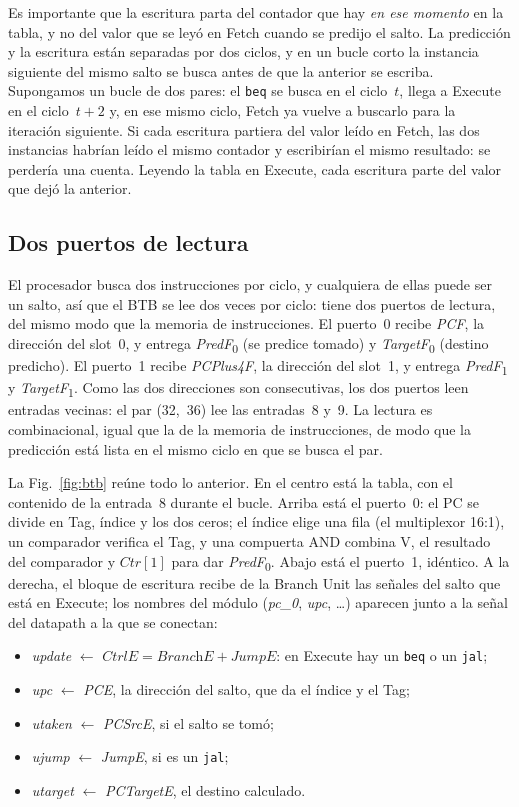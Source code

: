 \documentclass[11pt,a4paper]{article}
\newcommand{\sig}[1]{\textit{#1}}
\newcommand{\sigk}[2]{\textit{#1}\textsubscript{#2}}
\newcommand{\ins}[1]{\texttt{#1}}
\begin{document}
Es importante que la escritura parta del contador que hay \emph{en ese momento} en la tabla,
y no del valor que se leyó en Fetch cuando se predijo el salto. La predicción y la escritura
están separadas por dos ciclos, y en un bucle corto la instancia siguiente del mismo salto se
busca antes de que la anterior se escriba. Supongamos un bucle de dos pares: el \ins{beq} se
busca en el ciclo~$t$, llega a Execute en el ciclo~$t+2$ y, en ese mismo ciclo, Fetch ya
vuelve a buscarlo para la iteración siguiente. Si cada escritura partiera del valor leído en
Fetch, las dos instancias habrían leído el mismo contador y escribirían el mismo resultado:
se perdería una cuenta. Leyendo la tabla en Execute, cada escritura parte del valor que dejó
la anterior.

\subsection{Dos puertos de lectura}

El procesador busca dos instrucciones por ciclo, y cualquiera de ellas puede ser un salto,
así que el BTB se lee dos veces por ciclo: tiene dos puertos de lectura, del mismo modo que
la memoria de instrucciones. El puerto~0 recibe \sig{PCF}, la dirección del slot~0, y
entrega \sigk{PredF}{0} (se predice tomado) y \sigk{TargetF}{0} (destino predicho). El
puerto~1 recibe \sig{PCPlus4F}, la dirección del slot~1, y entrega \sigk{PredF}{1} y
\sigk{TargetF}{1}. Como las dos direcciones son consecutivas, los dos puertos leen
entradas vecinas: el par (32,~36) lee las entradas~8 y~9. La lectura es combinacional,
igual que la de la memoria de instrucciones, de modo que la predicción está lista en el
mismo ciclo en que se busca el par.

La Fig.~\ref{fig:btb} reúne todo lo anterior. En el centro está la tabla, con el contenido
de la entrada~8 durante el bucle. Arriba está el puerto~0: el PC se divide en Tag, índice y
los dos ceros; el índice elige una fila (el multiplexor 16:1), un comparador verifica el
Tag, y una compuerta AND combina V, el resultado del comparador y $\sig{Ctr}[1]$ para dar
\sigk{PredF}{0}. Abajo está el puerto~1, idéntico. A la derecha, el bloque de escritura
recibe de la Branch Unit las señales del salto que está en Execute; los nombres del módulo
(\sig{pc\_0}, \sig{upc}, \dots) aparecen junto a la señal del datapath a la que se conectan:
\begin{itemize}
  \item \sig{update} $\leftarrow$ $\sig{CtrlE} = \sig{BranchE} + \sig{JumpE}$: en Execute hay
        un \ins{beq} o un \ins{jal};
  \item \sig{upc} $\leftarrow$ \sig{PCE}, la dirección del salto, que da el índice y el Tag;
  \item \sig{utaken} $\leftarrow$ \sig{PCSrcE}, si el salto se tomó;
  \item \sig{ujump} $\leftarrow$ \sig{JumpE}, si es un \ins{jal};
  \item \sig{utarget} $\leftarrow$ \sig{PCTargetE}, el destino calculado.
\end{itemize}
\end{document}
